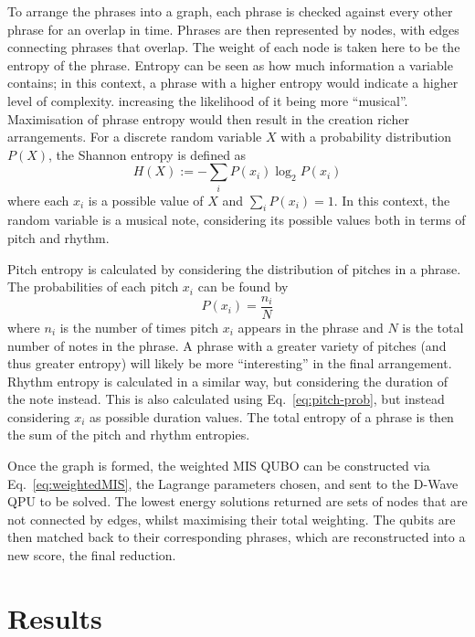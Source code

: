 \documentclass[aps,pra,10pt,twocolumn]{revtex4-2}
\begin{document}
To arrange the phrases into a graph, each phrase is checked against every other phrase for an overlap in time. Phrases are then represented by nodes, with edges connecting phrases that overlap. The weight of each node is taken here to be the entropy of the phrase. Entropy can be seen as how much  information a variable contains; in this context, a phrase with a higher entropy would indicate a higher level of complexity. increasing the likelihood of it being more ``musical''. Maximisation of phrase entropy would then result in the creation richer arrangements. For a discrete random variable $X$ with a probability distribution $P(X)$, the Shannon entropy is defined as
\begin{equation}
    H(X):=-\sum_i P(x_i)\log_2 P(x_i)
    \label{eq:entropy}
\end{equation}
where each $x_i$ is a possible value of $X$ and $\sum_i P(x_i)=1$. In this context, the random variable is a musical note, considering its possible values both in terms of pitch and rhythm.

Pitch entropy is calculated by considering the distribution of pitches in a phrase. The probabilities of each pitch $x_i$ can be found by
\begin{equation}
    P(x_i)=\frac{n_i}{N}
    \label{eq:pitch-prob}
\end{equation}
where $n_i$ is the number of times pitch $x_i$ appears in the phrase and $N$ is the total number of notes in the phrase. A phrase with a greater variety of pitches (and thus greater entropy) will likely be more ``interesting'' in the final arrangement.
Rhythm entropy is calculated in a similar way, but considering the duration of the note instead. This is also calculated using Eq.\ \ref{eq:pitch-prob}, but instead considering $x_i$ as possible duration values.
The total entropy of a phrase is then the sum of the pitch and rhythm entropies.

Once the graph is formed, the weighted MIS QUBO can be constructed via Eq.\ \ref{eq:weightedMIS}, the Lagrange parameters chosen, and sent to the D-Wave QPU to be solved. The lowest energy solutions returned are sets of nodes that are not connected by edges, whilst maximising their total weighting. The qubits are then matched back to their corresponding phrases, which are reconstructed into a new score, the final reduction.

\section{Results}
\end{document}
